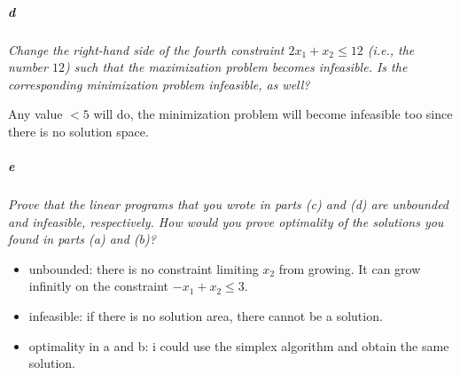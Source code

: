 \documentclass[12pt, a4]{article}
\begin{document}
\subparagraph{d}\label{pg:d} \textit{Change the right-hand side of the fourth constraint $2x_1 + x_2 \leq 12$ (i.e., the number $12$) such
that the maximization problem becomes infeasible. Is the corresponding minimization problem
infeasible, as well?}

Any value $< 5$ will do, the minimization problem will become infeasible too since there is no solution space.
\begin{figure}[h]
	\centering
\end{figure}


\subparagraph{e} \textit{Prove that the linear programs that you wrote in parts (c) and (d) are unbounded and infeasible,
respectively. How would you prove optimality of the solutions you found in parts (a) and (b)?}

\begin{itemize}
	\item unbounded: there is no constraint limiting $x_2$ from growing. It can grow infinitly on the constraint $-x_1 + x_2 \leq 3$.
	\item infeasible: if there is no solution area, there cannot be a solution.
	\item optimality in a and b: i could use the simplex algorithm and obtain the same solution.
\end{itemize}
\end{document}
